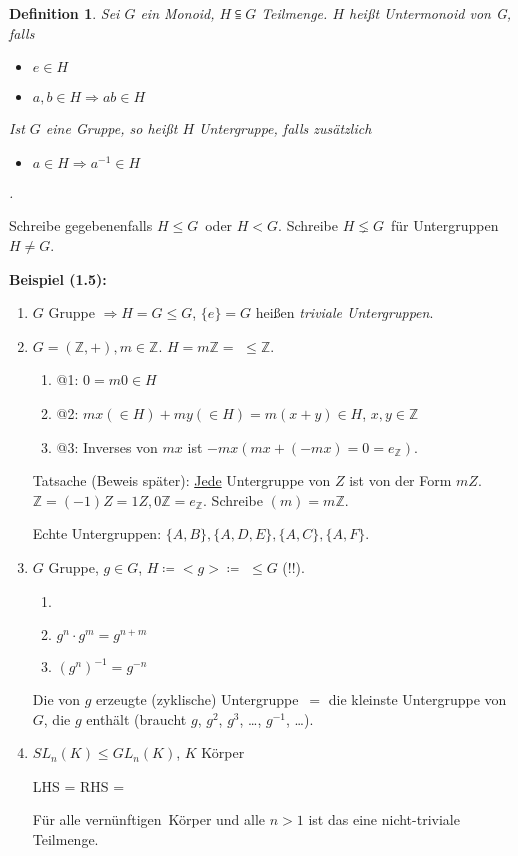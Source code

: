 \documentclass[10pt,a4paper]{article}
\newtheorem{defi}{Definition}
\begin{document}
\begin{defi} Sei $G$ ein Monoid, $H \subseteqq G$ Teilmenge. $H$ heißt \emph{Untermonoid} von G, falls
\begin{itemize}
\item $e \in H$
\item $a,b \in H \Rightarrow ab \in H$
\end{itemize}

Ist $G$ eine Gruppe, so heißt $H$ \emph{Untergruppe}, falls zusätzlich
\begin{itemize}
\item $a \in H \Rightarrow a^{-1} \in H$
\end{itemize}.
\end{defi} Schreibe gegebenenfalls \glqq $H \leqslant G$\grqq\ oder \glqq $H < G$\grqq. Schreibe \glqq $H \lneq G$\grqq\ für Untergruppen $H \neq G$. \bigskip

\textbf{Beispiel (1.5):} \begin{enumerate}
\item $G$ Gruppe $\Rightarrow H = G \leqslant G$, $\{e\} = G$ heißen \emph{triviale Untergruppen}.
\item $G = (\mathbb{Z}, +), m \in \mathbb{Z}$. $H = m \mathbb{Z} =$  $\leqslant \mathbb{Z}$.

	\begin{enumerate}
		\item @1: $0 = m0 \in H$
		\item @2: $mx (\in H) + my (\in H) = m (x + y) \in H$, $x,y \in \mathbb{Z}$
		\item @3: Inverses von $mx$ ist $-mx (mx + (-mx) = 0 = e_\mathbb{Z})$.
	\end{enumerate}

Tatsache (Beweis später): \underline{Jede} Untergruppe von $Z$ ist von der Form $m Z$. $\mathbb{Z} = (-1)Z = 1Z, 0 \mathbb{Z} = e_\mathbb{Z}$. Schreibe $(m) = m \mathbb{Z}$.

Echte Untergruppen: $\{A,B\}, \{A,D,E\}, \{A,C\}, \{A,F\}$.

\item $G$ Gruppe, $g \in G$, $H \coloneqq < g > \coloneqq$  $\leqslant G$ (!!). %

\begin{enumerate}
\item %
\item $g^n \cdot g^m = g^{n + m}$ %
\item $(g^n)^{-1} = g^{-n}$ %
\end{enumerate}

\glqq Die von $g$ erzeugte (zyklische) Untergruppe\grqq\ $=$ die kleinste Untergruppe von $G$, die $g$ enthält (braucht $g$, $g^2$, $g^3$, \dots , $g^{-1}$, \dots).

\item $SL_n(K) \leqslant GL_n(K)$, $K$ Körper

LHS = 
RHS = 

Für alle \glqq vernünftigen\grqq\ Körper und alle $n > 1$ ist das eine nicht-triviale Teilmenge.  
\end{enumerate}
\end{document}
